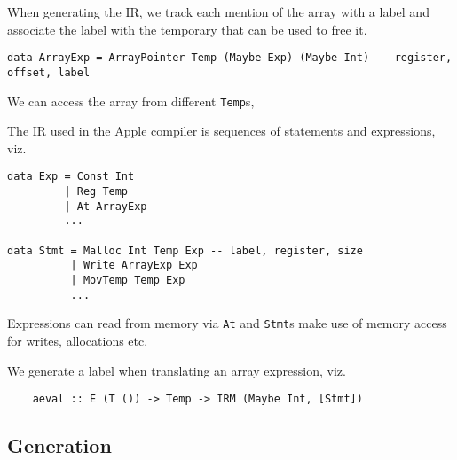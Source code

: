 \documentclass{article}
\begin{document}
When generating the IR, we track each mention of the array with a label and associate the label with the temporary that can be used to free it.

\begin{verbatim}
data ArrayExp = ArrayPointer Temp (Maybe Exp) (Maybe Int) -- register, offset, label
\end{verbatim}

We can access the array from different {\tt Temp}s,




The IR used in the Apple compiler is sequences of statements and expressions, viz.

\begin{verbatim}
data Exp = Const Int
         | Reg Temp
         | At ArrayExp
         ...

data Stmt = Malloc Int Temp Exp -- label, register, size
          | Write ArrayExp Exp
          | MovTemp Temp Exp
          ...
\end{verbatim}

Expressions can read from memory via {\tt At} and {\tt Stmt}s make use of memory access for writes, allocations etc.

We generate a label when translating an array expression, viz. %

\begin{verbatim}
    aeval :: E (T ()) -> Temp -> IRM (Maybe Int, [Stmt])
\end{verbatim}

\subsection{Generation}
\end{document}
